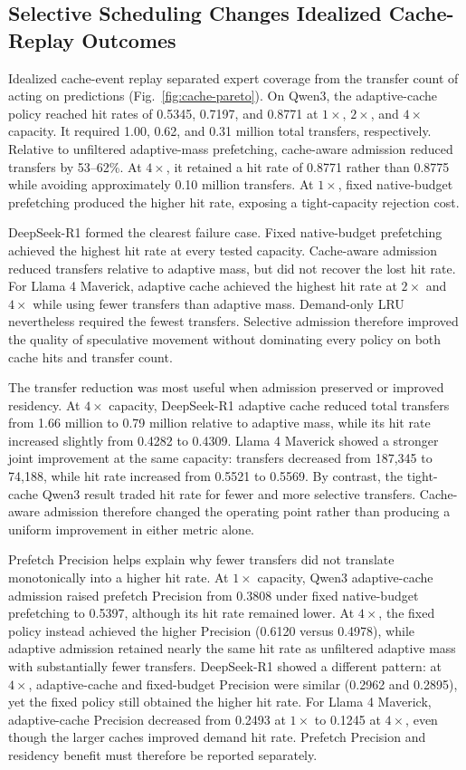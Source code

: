 \documentclass[conference]{IEEEtran}
\begin{document}
\subsection{Selective Scheduling Changes Idealized Cache-Replay Outcomes}

Idealized cache-event replay separated expert coverage from the transfer count
of acting on predictions
(Fig.~\ref{fig:cache-pareto}). On Qwen3, the adaptive-cache policy reached hit
rates of 0.5345, 0.7197, and 0.8771 at \(1\times\), \(2\times\), and
\(4\times\) capacity. It required 1.00, 0.62, and 0.31 million total
transfers, respectively. Relative to unfiltered adaptive-mass prefetching,
cache-aware admission reduced transfers by 53--62\%. At \(4\times\), it
retained a hit rate of 0.8771 rather than 0.8775 while avoiding approximately
0.10 million transfers. At \(1\times\), fixed native-budget prefetching
produced the higher hit rate, exposing a tight-capacity rejection cost.

DeepSeek-R1 formed the clearest failure case. Fixed native-budget prefetching
achieved the highest hit rate at every tested capacity. Cache-aware admission
reduced transfers relative to adaptive mass, but did not recover the lost hit
rate. For Llama 4 Maverick, adaptive cache achieved the highest hit rate at
\(2\times\) and \(4\times\) while using fewer transfers than adaptive mass.
Demand-only LRU nevertheless required the fewest transfers. Selective
admission therefore improved the quality of speculative movement without
dominating every policy on both cache hits and transfer count.

The transfer reduction was most useful when admission preserved or improved
residency. At \(4\times\) capacity, DeepSeek-R1 adaptive cache reduced total
transfers from 1.66 million to 0.79 million relative to adaptive mass, while
its hit rate increased slightly from 0.4282 to 0.4309. Llama 4 Maverick showed
a stronger joint improvement at the same capacity: transfers decreased from
187,345 to 74,188, while hit rate increased from 0.5521 to 0.5569. By contrast,
the tight-cache Qwen3 result traded hit rate for fewer and more selective
transfers. Cache-aware admission therefore changed the operating point rather
than producing a uniform improvement in either metric alone.

Prefetch Precision helps explain why fewer transfers did not translate
monotonically into a higher hit rate. At \(1\times\) capacity, Qwen3
adaptive-cache admission raised prefetch Precision from 0.3808 under fixed
native-budget prefetching to 0.5397, although its hit rate remained lower. At
\(4\times\), the fixed policy instead achieved the higher Precision (0.6120
versus 0.4978), while adaptive admission retained nearly the same hit rate as
unfiltered adaptive mass with substantially fewer transfers. DeepSeek-R1
showed a different pattern: at \(4\times\), adaptive-cache and fixed-budget
Precision were similar (0.2962 and 0.2895), yet the fixed policy still obtained
the higher hit rate. For Llama 4 Maverick, adaptive-cache Precision decreased
from 0.2493 at \(1\times\) to 0.1245 at \(4\times\), even though the larger
caches improved demand hit rate. Prefetch Precision and residency benefit must
therefore be reported separately.
\end{document}
